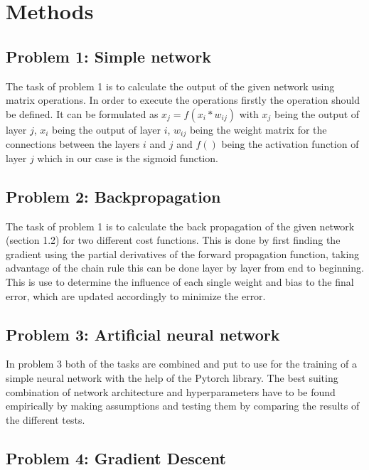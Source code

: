 \chapter{Methods}
\section{Problem 1: Simple network}
The task of problem 1 is to calculate the output of the given network using matrix operations.
In order to execute the operations firstly the operation should be defined.
It can be formulated as $x_j=f(x_{i}*w_{ij})$ with $x_j$ being the output of layer $j$, $x_{i}$ being the output of layer $i$, $w_{ij}$ being the weight matrix for the connections between the layers $i$ and $j$ and $f()$ being the activation function of layer $j$ which in our case is the sigmoid function.\\

   
\section{Problem 2: Backpropagation}
The task of problem 1 is to calculate the back propagation of the given network (section 1.2) for two different cost functions. This is done by first finding the gradient using the partial derivatives of the forward propagation function, taking advantage of the chain rule this can be done layer by layer from end to beginning. This is use to determine the influence of each single weight and bias to the final error, which are updated accordingly to minimize the error.
\section{Problem 3: Artificial neural network}
In problem 3 both of the tasks are combined and put to use for the training of a simple neural network with the help of the Pytorch library. The best suiting combination of network architecture and hyperparameters have to be found empirically by making assumptions and testing them by comparing the results of the different tests.
\section{Problem 4: Gradient Descent}
